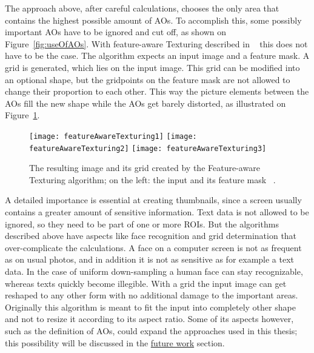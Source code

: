 \documentclass[draft,final]{vutinfth} %
\begin{document}
	The approach above, after careful calculations, chooses the only area that contains the highest possible amount of AOs.
	To accomplish this, some possibly important AOs have to be ignored and cut off, as shown on Figure~\ref{fig:useOfAOs}.
	With feature-aware Texturing described in ~\cite{gal2006feature} this does not have to be the case.
	The algorithm expects an input image and a feature mask.
	A grid is generated, which lies on the input image.
	This grid can be modified into an optional shape, but the gridpoints on the feature mask are not allowed to change their proportion to each other.
	This way the picture elements between the AOs fill the new shape while the AOs get barely distorted, as illustrated on Figure~\ref{fig:fat}.\par 
	\begin{figure}[h]
		\texttt{[image: featureAwareTexturing1]}\hfill
		\texttt{[image: featureAwareTexturing2]}\hfill
		\texttt{[image: featureAwareTexturing3]}
		\caption{The resulting image and its grid created  by the Feature-aware Texturing algorithm; on the left: the input and its feature mask ~\cite{gal2006feature}. }
		\label{fig:fat}
	\end{figure}
	A detailed importance is essential at creating thumbnails, since a screen usually contains a greater amount of sensitive information.
	Text data is not allowed to be ignored, so they need to be part of one or more ROIs.
	But the algorithms described above have aspects like face recognition and grid determination that over-complicate the calculations.
	A face on a computer screen is not as frequent as on usual photos, and in addition it is not as sensitive as for example a text data.
	In the case of uniform down-sampling a human face can stay recognizable, whereas texts quickly become illegible. 
	With a grid the input image can get reshaped to any other form with no additional damage to the important areas.
	Originally this algorithm is meant to fit the input into completely other shape and not to resize it according to its aspect ratio.
	Some of its aspects however, such as the definition of AOs, could expand the approaches used in this thesis; this possibility will be discussed in the \hyperref[futureWork]{future work} section.
	
\end{document}
